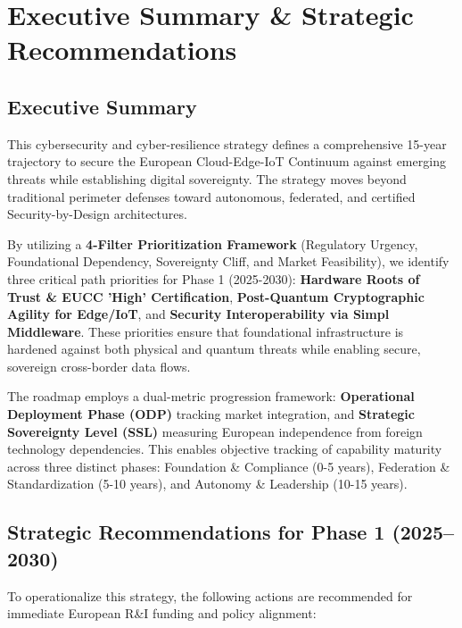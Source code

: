 \documentclass{ieeeaccess}
\begin{document}
\section{Executive Summary \& Strategic Recommendations}

\subsection*{Executive Summary}
This cybersecurity and cyber-resilience strategy defines a comprehensive 15-year trajectory to secure the European Cloud-Edge-IoT Continuum against emerging threats while establishing digital sovereignty. The strategy moves beyond traditional perimeter defenses toward autonomous, federated, and certified Security-by-Design architectures.

By utilizing a \textbf{4-Filter Prioritization Framework} (Regulatory Urgency, Foundational Dependency, Sovereignty Cliff, and Market Feasibility), we identify three critical path priorities for Phase 1 (2025-2030): \textbf{Hardware Roots of Trust \& EUCC 'High' Certification}, \textbf{Post-Quantum Cryptographic Agility for Edge/IoT}, and \textbf{Security Interoperability via Simpl Middleware}. These priorities ensure that foundational infrastructure is hardened against both physical and quantum threats while enabling secure, sovereign cross-border data flows.

The roadmap employs a dual-metric progression framework: \textbf{Operational Deployment Phase (ODP)} tracking market integration, and \textbf{Strategic Sovereignty Level (SSL)} measuring European independence from foreign technology dependencies. This enables objective tracking of capability maturity across three distinct phases: Foundation \& Compliance (0-5 years), Federation \& Standardization (5-10 years), and Autonomy \& Leadership (10-15 years).

\subsection*{Strategic Recommendations for Phase 1 (2025--2030)}
To operationalize this strategy, the following actions are recommended for immediate European R\&I funding and policy alignment:
\end{document}
